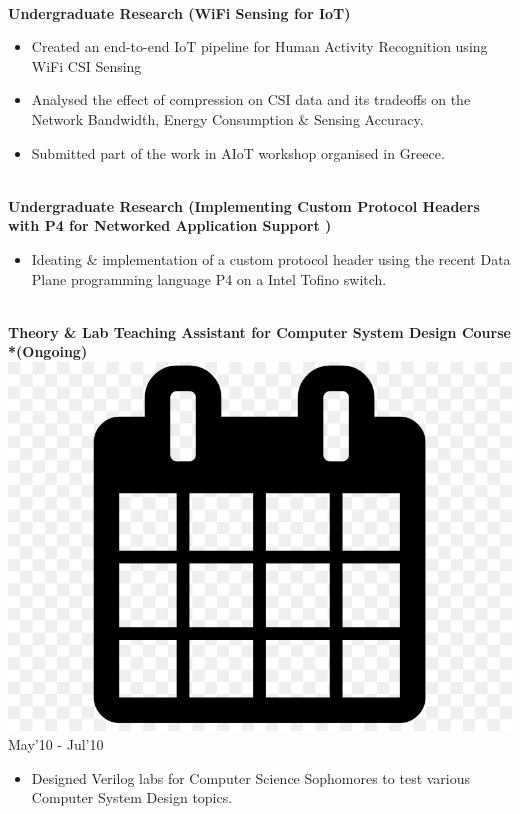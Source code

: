\documentclass[10pt,article]{article}
\newcommand{\myMargin}{0.2in}
\newcommand{\myfont}[2]{\fontsize{#1}{#1}\selectfont #2}
\newcommand{\projecttopic}[1]{\myfont{9pt}{\textbf{#1}}}
\newcommand{\mycal}[1]{\includegraphics[scale=0.018]{calendar.png} \myfont{10}{#1}}
\begin{document}
\begin{multicols*}{2}
\noindent
\hrulefill \\ [-0.5cm]
\projecttopic{Undergraduate Research (WiFi Sensing for IoT)}
\begin{itemize}
    \item Created an end-to-end IoT pipeline for Human Activity Recognition using WiFi CSI Sensing
    \item Analysed the effect of compression on CSI data and its tradeoffs on the Network Bandwidth, Energy Consumption \& Sensing Accuracy.
    \item Submitted part of the work in AIoT workshop organised in Greece. 
\end{itemize}
\vspace{3pt}

\noindent
\hrulefill \\ [-0.5cm]
\projecttopic{Undergraduate Research (Implementing Custom Protocol Headers with P4 for Networked Application Support )} 
\begin{itemize}
    \item Ideating \& implementation of a custom protocol header using the recent Data Plane programming language P4 on a Intel Tofino switch.
\end{itemize}
\vspace{3pt}

\noindent
\hrulefill \\ [-0.5cm]
\projecttopic{Theory \& Lab Teaching Assistant for Computer System Design Course *(Ongoing)} \hfill \mycal{May'10 - Jul'10} 
\begin{itemize}[leftmargin=\myMargin]
    \item Designed Verilog labs for Computer Science Sophomores to test various Computer System Design topics. 
\end{itemize}
\vspace{3pt}


\end{multicols*}
\end{document}

